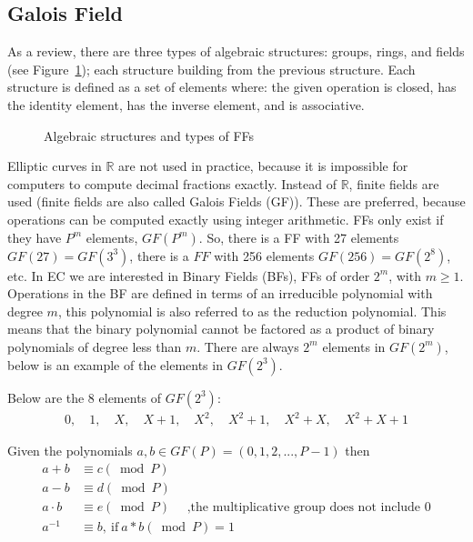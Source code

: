 \subsection{Galois Field} 
As a review, there are three types of algebraic structures: groups, rings, and fields (see Figure~\ref{fig:DH:DHKE_3}); each structure building from the previous structure.  Each structure is defined as a set of elements where: the given operation is closed, has the identity element, has the inverse element, and is associative.
\begin{figure}[H]
	  \caption{\label{fig:DH:DHKE_3} Algebraic structures and types of FFs }
\end{figure}
Elliptic curves in $\mathbb{R}$ are not used in practice, because it is impossible for computers to compute decimal fractions exactly.  Instead of $\mathbb{R}$, finite fields are used (finite fields are also called Galois Fields (GF)).  These are preferred, because operations can be computed exactly using integer arithmetic. FFs only exist if they have $P^m$ elements, $GF(P^m)$. So, there is a FF with 27 elements $GF(27) = GF(3^3)$, there is a $FF$ with 256 elements $GF(256) = GF(2^8)$, etc.  In EC we are interested in Binary Fields (BFs), FFs of order $2^m$, with $m ≥ 1$.  Operations in the BF are defined in terms of an irreducible polynomial with degree $m$, this polynomial is also referred to as the reduction polynomial.  This means that the binary polynomial cannot be factored as a product of binary polynomials of degree less than $m$.  There are always $2^m$ elements in $GF(2^m)$, below is an example of the elements in $GF(2^3)$.  
\newline \newline
\begin{eg} Below are the 8 elements of $GF(2^3)$:
\begin{align*}
0, \quad 1, \quad X, \quad X +1, \quad X^2, \quad X^2+1, \quad X^2 + X, \quad X^2 + X + 1
 \end{align*}
\end{eg}
\begin{rem} Given the polynomials $a,b \in  GF(P) = (0,1,2,...,P-1)$ then 
\begin{align*} 		
		a + b &\equiv c (\bmod P)\\
		a - b &\equiv d (\bmod P)\\
		a \cdot b &\equiv e (\bmod P) \quad \text{ ,the multiplicative group does not include 0}\\
		a^{-1} &\equiv b, \mathrm{~if~} a * b (\bmod P) = 1
\end{align*}
\end{rem}	
